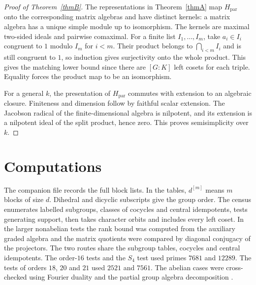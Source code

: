 \documentclass[11pt]{amsart}
\theoremstyle{definition}
\newcommand{\paralg}{H_{\mathrm{par}}}
\begin{document}
\begin{proof}[Proof of Theorem~\ref{thmB}]
The representations in Theorem~\ref{thmA} map $\paralg$ onto the corresponding matrix algebras and have distinct kernels: a matrix algebra has a unique simple module up to isomorphism. The kernels are maximal two-sided ideals and pairwise comaximal. For a finite list $I_1,\dots,I_m$, take $a_i\in I_i$ congruent to $1$ modulo $I_m$ for $i<m$. Their product belongs to $\bigcap_{i<m}I_i$ and is still congruent to $1$, so induction gives surjectivity onto the whole product. This gives the matching lower bound since there are $[G:K]$ left cosets for each triple. Equality forces the product map to be an isomorphism.

For a general $k$, the presentation of $\paralg$ commutes with extension to an algebraic closure. Finiteness and dimension follow by faithful scalar extension. The Jacobson radical of the finite-dimensional algebra is nilpotent, and its extension is a nilpotent ideal of the split product, hence zero. This proves semisimplicity over $k$.
\end{proof}


\section{Computations}
The companion file  records the full block lists. In the tables, $d^{[m]}$ means $m$ blocks of size $d$. Dihedral and dicyclic subscripts give the group order. The census enumerates labelled subgroups, classes of cocycles and central idempotents, tests generating support, then takes character orbits and includes every left coset. In the larger nonabelian tests the rank bound was computed from the auxiliary graded algebra and the matrix quotients were compared by diagonal conjugacy of the projectors. The two routes share the subgroup tables, cocycles and central idempotents. The order-$16$ tests and the $S_4$ test used primes $7681$ and $12289$. The tests of orders $18$, $20$ and $21$ used $2521$ and $7561$. The abelian cases were cross-checked using Fourier duality and the partial group algebra decomposition \cite{DEP}.
\end{document}
